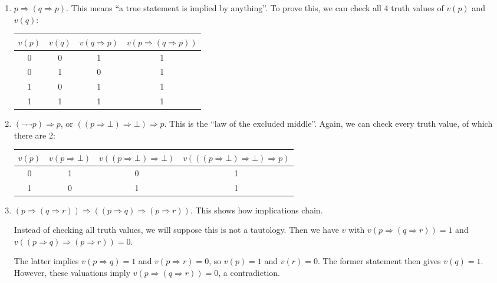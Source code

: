 \documentclass[12pt]{article}
\begin{document}
\begin{exbox}
	\begin{enumerate}[1.]
		\item $p \Rightarrow (q \Rightarrow p)$. This means ``a true statement is implied by anything''. To prove this, we can check all 4 truth values of $v(p)$ and $v(q)$:
			\begin{center}
			\begin{tabular}{|cccc|}
				\hline
				$v(p)$ & $v(q)$ & $v(q \Rightarrow p)$ & $v(p \Rightarrow (q \Rightarrow p))$ \\
				\hline
				0 & 0 & 1 & 1 \\
				0 & 1 & 0 & 1 \\
				1 & 0 & 1 & 1 \\
				1 & 1 & 1 & 1 \\
				\hline
			\end{tabular}
			\end{center}
		\item $(\neg \neg p) \Rightarrow p$, or $((p \Rightarrow \bot) \Rightarrow \bot) \Rightarrow p$. This is the ``law of the excluded middle''. Again, we can check every truth value, of which there are 2:
			\begin{center}
			\begin{tabular}{|cccc|}
				\hline
				$v(p)$ & $v(p \Rightarrow \bot)$ & $v((p \Rightarrow \bot) \Rightarrow \bot)$ & $v(((p \Rightarrow \bot) \Rightarrow \bot) \Rightarrow p)$ \\
				\hline
				0 & 1 & 0 & 1 \\
				1 & 0 & 1 & 1 \\
				\hline
			\end{tabular}
			\end{center}
		\item $(p \Rightarrow (q \Rightarrow r)) \Rightarrow ((p \Rightarrow q) \Rightarrow (p \Rightarrow r))$. This shows how implications chain.

			Instead of checking all truth values, we will suppose this is not a tautology. Then we have $v$ with $v(p \Rightarrow (q \Rightarrow r)) = 1$ and $v((p \Rightarrow q) \Rightarrow (p \Rightarrow r)) = 0$.

			The latter implies $v(p \Rightarrow q) = 1$ and $v(p \Rightarrow r) = 0$, so $v(p) = 1$ and $v(r) = 0$. The former statement then gives $v(q) = 1$. However, these valuations imply $v(p \Rightarrow (q \Rightarrow r)) = 0$, a contradiction.
	\end{enumerate}
\end{exbox}
\end{document}
